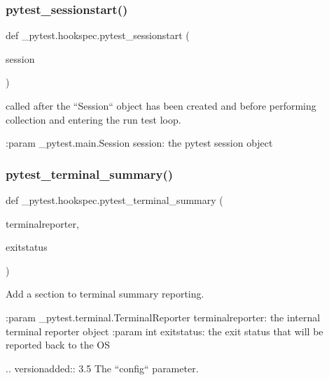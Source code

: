 \subsubsection{\texorpdfstring{pytest\+\_\+sessionstart()}{pytest\_sessionstart()}}
{\footnotesize\ttfamily def \+\_\+pytest.\+hookspec.\+pytest\+\_\+sessionstart (\begin{DoxyParamCaption}\item[{}]{session }\end{DoxyParamCaption})}

\begin{DoxyVerb}called after the ``Session`` object has been created and before performing collection
and entering the run test loop.

:param _pytest.main.Session session: the pytest session object
\end{DoxyVerb}
 \mbox{\label{namespace__pytest_1_1hookspec_aba4d803fe6e8f1673bde427fa1279f0f}} 
\subsubsection{\texorpdfstring{pytest\+\_\+terminal\+\_\+summary()}{pytest\_terminal\_summary()}}
{\footnotesize\ttfamily def \+\_\+pytest.\+hookspec.\+pytest\+\_\+terminal\+\_\+summary (\begin{DoxyParamCaption}\item[{}]{terminalreporter,  }\item[{}]{exitstatus }\end{DoxyParamCaption})}

\begin{DoxyVerb}Add a section to terminal summary reporting.

:param _pytest.terminal.TerminalReporter terminalreporter: the internal terminal reporter object
:param int exitstatus: the exit status that will be reported back to the OS

.. versionadded:: 3.5
    The ``config`` parameter.
\end{DoxyVerb}
 \mbox{\label{namespace__pytest_1_1hookspec_a1bd77a9e730339f8a281abfe18df613d}} 
